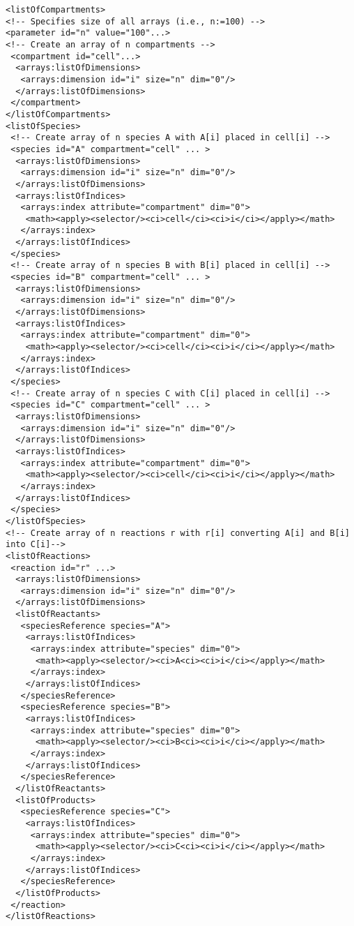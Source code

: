 \begin{verbatim}
<listOfCompartments> 
<!-- Specifies size of all arrays (i.e., n:=100) -->
<parameter id="n" value="100"...>
<!-- Create an array of n compartments -->
 <compartment id="cell"...>
  <arrays:listOfDimensions>
   <arrays:dimension id="i" size="n" dim="0"/>
  </arrays:listOfDimensions>
 </compartment>
</listOfCompartments> 
<listOfSpecies>
 <!-- Create array of n species A with A[i] placed in cell[i] -->
 <species id="A" compartment="cell" ... > 
  <arrays:listOfDimensions>
   <arrays:dimension id="i" size="n" dim="0"/>
  </arrays:listOfDimensions>
  <arrays:listOfIndices>
   <arrays:index attribute="compartment" dim="0">
    <math><apply><selector/><ci>cell</ci><ci>i</ci></apply></math>
   </arrays:index>
  </arrays:listOfIndices>
 </species>
 <!-- Create array of n species B with B[i] placed in cell[i] -->
 <species id="B" compartment="cell" ... > 
  <arrays:listOfDimensions>
   <arrays:dimension id="i" size="n" dim="0"/>
  </arrays:listOfDimensions>
  <arrays:listOfIndices>
   <arrays:index attribute="compartment" dim="0">
    <math><apply><selector/><ci>cell</ci><ci>i</ci></apply></math>
   </arrays:index>
  </arrays:listOfIndices>
 </species>
 <!-- Create array of n species C with C[i] placed in cell[i] -->
 <species id="C" compartment="cell" ... >
  <arrays:listOfDimensions>
   <arrays:dimension id="i" size="n" dim="0"/>
  </arrays:listOfDimensions>
  <arrays:listOfIndices>
   <arrays:index attribute="compartment" dim="0">
    <math><apply><selector/><ci>cell</ci><ci>i</ci></apply></math>
   </arrays:index>
  </arrays:listOfIndices>
 </species>
</listOfSpecies>
<!-- Create array of n reactions r with r[i] converting A[i] and B[i] into C[i]-->
<listOfReactions>
 <reaction id="r" ...> 
  <arrays:listOfDimensions>
   <arrays:dimension id="i" size="n" dim="0"/>
  </arrays:listOfDimensions>
  <listOfReactants>
   <speciesReference species="A">
    <arrays:listOfIndices>
     <arrays:index attribute="species" dim="0">
      <math><apply><selector/><ci>A<ci><ci>i</ci></apply></math>
     </arrays:index>
    </arrays:listOfIndices>
   </speciesReference>
   <speciesReference species="B"> 
    <arrays:listOfIndices>
     <arrays:index attribute="species" dim="0">
      <math><apply><selector/><ci>B<ci><ci>i</ci></apply></math>
     </arrays:index>
    </arrays:listOfIndices>
   </speciesReference>
  </listOfReactants> 
  <listOfProducts>
   <speciesReference species="C"> 
    <arrays:listOfIndices>
     <arrays:index attribute="species" dim="0">
      <math><apply><selector/><ci>C<ci><ci>i</ci></apply></math>
     </arrays:index>
    </arrays:listOfIndices>
   </speciesReference>
  </listOfProducts>
 </reaction>
</listOfReactions>
\end{verbatim}

